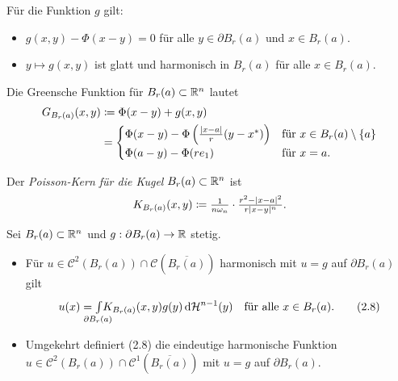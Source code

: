 \documentclass{cheat-sheet}
\newcommand{\HM}{\mathcal{H}} %
\begin{document}
\begin{prop}
  Für die Funktion $g$ gilt:
  \begin{itemize}
    \item $g(x, y) - \Phi(x - y) = 0$ für alle $y \in \partial B_r(a)$ und $x \in B_r(a)$.
    \item $y \mapsto g(x, y)$ ist glatt und harmonisch in $B_r(a)$ für alle $x \in B_r(a)$.
  \end{itemize}
\end{prop}

\begin{kor}
  Die Greensche Funktion für $B_r(a) \subset \mathbb{R}^n$ lautet
  \begin{align*}
    G_{B_r(a)}(x, y) &\coloneqq \Phi(x - y) + g(x, y)\\
    &= \begin{cases}
      \Phi(x - y) - \Phi\left(\tfrac{\lvert x-a\rvert}{r} (y - x^*)\right) & \text{für $x \in B_r(a) \setminus \{ a \}$}\\
      \Phi(a - y) - \Phi(r e_1) & \text{für $x = a$.}
    \end{cases}
  \end{align*}
\end{kor}

\begin{defn}
  Der \emph{Poisson-Kern für die Kugel} $B_r(a) \subset \mathbb{R}^n$ ist
  \[ K_{B_r(a)}(x, y) \coloneqq \tfrac{1}{n \omega_n} \cdot \tfrac{r^2 - \lvert x - a\rvert^2}{r \lvert x - y\rvert^n}. \]
\end{defn}

\begin{satz}
  Sei $B_r(a) \subset \mathbb{R}^n$ und $g : \partial B_r(a) \to \mathbb{R}$ stetig.
  \begin{itemize}
    \item Für $u {\in} \mathcal{C}^2(B_r(a)) \cap \mathcal{C}(\overline{B_r(a)})$ harmonisch mit $u {=} g$ auf $\partial B_r(a)$ gilt
    \[
      u(x) = \Int{\mathclap{\partial B_r(a)}}{}{K_{B_r(a)}(x,y) g(y)}{\HM^{n-1}(y)}
      \quad \text{für alle $x \in B_r(a)$.} \tag{2.8}
    \]
    \item Umgekehrt definiert (2.8) die eindeutige harmonische Funktion $u \in \mathcal{C}^2(B_r(a)) \cap \mathcal{C}^1(\overline{B_r(a)})$ mit $u = g$ auf $\partial B_r(a)$.
  \end{itemize}
\end{satz}

\end{document}
